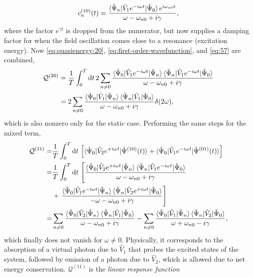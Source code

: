 \documentclass[%
class = book,%
crop = false,%
float = true,%
multi = true,%
preview = false,%
]{standalone}
\begin{document}
\begin{equation}
  \label{eq:57}
  c_{n}^{(10)}(t) = \frac{\braket{\tilde{\Psi}_{n}|\hat{V}_{1}e^{-i\omega t}|\tilde{\Psi}_{0}}e^{i\omega_{n0}t}}{\omega - \omega_{n0} + i\gamma},
\end{equation} %
where the factor \(e^{\gamma t}\) is dropped from the numerator, but now supplies a damping factor for when the field oscillation comes close to a resonance (excitation energy). Now \eqref{eq:quasienergy-20}, \eqref{eq:first-order-wavefunction}, and \eqref{eq:57} are combined,
\begin{equation}
  \label{eq:58}
  \begin{aligned}
    \mathcal{Q}^{(20)} &= \frac{1}{T} \int_{0}^{T} \mathrm{d}t \, 2\sum_{n\neq 0} \frac{\braket{\tilde{\Psi}_{0}|\hat{V}_{1}e^{-i\omega t}|\tilde{\Psi}_{n}}\braket{\tilde{\Psi}_{n}|\hat{V}_{1}e^{-i\omega t}|\tilde{\Psi}_{0}}}{\omega - \omega_{n0} + i\gamma} \\
    &= 2\sum_{n\neq 0} \frac{\braket{\tilde{\Psi}_{0}|\hat{V}_{1}|\tilde{\Psi}_{n}}\braket{\tilde{\Psi}_{n}|\hat{V}_{1}|\tilde{\Psi}_{0}}}{\omega - \omega_{n0} + i\gamma} \delta(2\omega),
  \end{aligned}
\end{equation}
which is also nonzero only for the static case. Performing the same steps for the mixed term,
\begin{equation}
  \label{eq:59}
  \begin{aligned}
    \mathcal{Q}^{(11)} = &\frac{1}{T} \int_{0}^{T} \mathrm{d}t \, \left[ \braket{\tilde{\Psi}_{0}|\hat{V}_{2}e^{+i\omega t}|\tilde{\Psi}^{(10)}(t)} + \braket{\tilde{\Psi}_{0}|\hat{V}_{1}e^{-i\omega t}|\tilde{\Psi}^{(01)}(t)} \right] \\
    = &\frac{1}{T} \int_{0}^{T} \mathrm{d}t \, \left[ \frac{\braket{\tilde{\Psi}_{0}|\hat{V}_{2}e^{+i\omega t}|\tilde{\Psi}_{n}}\braket{\tilde{\Psi}_{n}|\hat{V}_{1}e^{-i\omega t}|\tilde{\Psi}_{0}}}{\omega - \omega_{n0} + i\gamma} \right. \\
    &+ \left. \frac{\braket{\tilde{\Psi}_{0}|\hat{V}_{1}e^{-i\omega t}|\tilde{\Psi}_{n}}\braket{\tilde{\Psi}_{n}|\hat{V}_{2}e^{+i\omega t}|\tilde{\Psi}_{0}}}{-\omega - \omega_{n0} + i\gamma} \right]  \\
    = &\sum_{n\neq 0} \frac{\braket{\tilde{\Psi}_{0}|\hat{V}_{2}|\tilde{\Psi}_{n}}\braket{\tilde{\Psi}_{n}|\hat{V}_{1}|\tilde{\Psi}_{0}}}{\omega - \omega_{n0} + i\gamma} - \sum_{n\neq 0} \frac{\braket{\tilde{\Psi}_{0}|\hat{V}_{1}|\tilde{\Psi}_{n}}\braket{\tilde{\Psi}_{n}|\hat{V}_{2}|\tilde{\Psi}_{0}}}{\omega + \omega_{n0} - i\gamma},
  \end{aligned}
\end{equation}
which finally does not vanish for \(\omega \neq 0\). Physically, it corresponds to the absorption of a virtual photon due to \(\hat{V}_{1}\) that probes the excited states of the system, followed by emission of a photon due to \(\hat{V}_{2}\), which is allowed due to net energy conservation. \(\mathcal{Q}^{(11)}\) is the \emph{linear response function}
\end{document}
